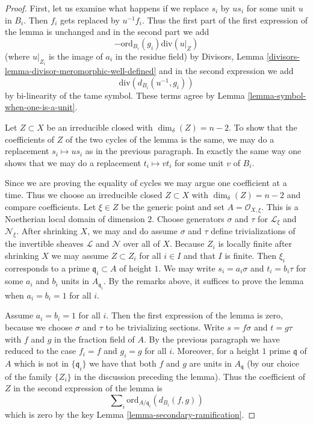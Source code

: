 \begin{proof}
First, let us examine what happens if we replace $s_i$ by $us_i$
for some unit $u$ in $B_i$. Then $f_i$ gets replaced by $u^{-1} f_i$.
Thus the first part of the first expression of the lemma is unchanged
and in the second part we add
$$
-\text{ord}_{B_i}(g_i)\text{div}(u|_Z)
$$
(where $u|_{Z_i}$ is the image of $a_i$ in the residue field) by
Divisors, Lemma \ref{divisors-lemma-divisor-meromorphic-well-defined}
and in the second expression we add
$$
\text{div}(d_{B_i}(u^{-1}, g_i))
$$
by bi-linearity of the tame symbol. These terms agree by
Lemma \ref{lemma-symbol-when-one-is-a-unit}.

\medskip\noindent
Let $Z \subset X$ be an irreducible closed with $\dim_\delta(Z) = n - 2$.
To show that the coefficients of $Z$ of the two cycles of the lemma
is the same, we may do a replacement $s_i \mapsto us_i$ as in the previous
paragraph. In exactly the same way one shows that we may do a replacement
$t_i \mapsto vt_i$ for some unit $v$ of $B_i$.

\medskip\noindent
Since we are proving the equality of cycles we may argue one coefficient
at a time. Thus we choose an irreducible closed $Z \subset X$
with $\dim_\delta(Z) = n - 2$ and compare coefficients. Let $\xi \in Z$
be the generic point and set $A = \mathcal{O}_{X, \xi}$. This is a Noetherian
local domain of dimension $2$. Choose generators $\sigma$ and $\tau$
for $\mathcal{L}_\xi$ and $\mathcal{N}_\xi$. After shrinking $X$, we may
and do assume $\sigma$ and $\tau$ define trivializations
of the invertible sheaves $\mathcal{L}$ and $\mathcal{N}$ over all of $X$.
Because $Z_i$ is locally
finite after shrinking $X$ we may assume $Z \subset Z_i$ for all $i \in I$
and that $I$ is finite. Then $\xi_i$ corresponds to a prime
$\mathfrak q_i \subset A$ of height $1$.
We may write $s_i = a_i \sigma$ and $t_i = b_i \tau$
for some $a_i$ and $b_i$ units in $A_{\mathfrak q_i}$.
By the remarks above, it suffices to prove the lemma when
$a_i = b_i = 1$ for all $i$.

\medskip\noindent
Assume $a_i = b_i = 1$ for all $i$. Then the first expression of the
lemma is zero, because we choose $\sigma$ and $\tau$ to be trivializing
sections. Write $s = f\sigma$ and $t = g \tau$ with $f$ and $g$ in the
fraction field of $A$. By the previous paragraph we have reduced to the case
$f_i = f$ and $g_i = g$ for all $i$. Moreover, for a height $1$ prime
$\mathfrak q$ of $A$ which is not in $\{\mathfrak q_i\}$ we have
that both $f$ and $g$ are units in $A_\mathfrak q$ (by our choice of
the family $\{Z_i\}$ in the discussion preceding the lemma). Thus
the coefficient of $Z$ in the second expression of the lemma is
$$
\sum\nolimits_i \text{ord}_{A/\mathfrak q_i}(d_{B_i}(f, g))
$$
which is zero by the key Lemma \ref{lemma-secondary-ramification}.
\end{proof}






